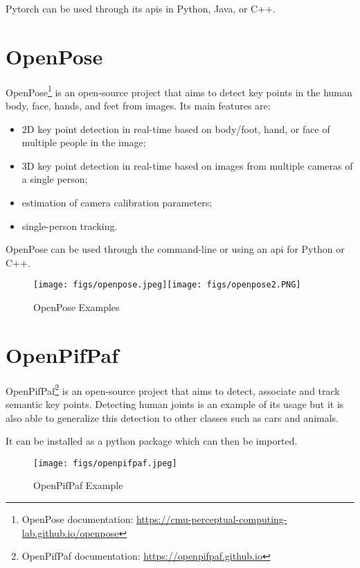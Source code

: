 Pytorch can be used through its \acp{api} in Python, Java, or C++.

\section{OpenPose}
\label{section:openpose}

OpenPose\cite{Cao2021,Simon2017,Cao2018,Wei2016}\footnote{OpenPose documentation: \url{https://cmu-perceptual-computing-lab.github.io/openpose}} is an open-source project that aims to detect key points in the human body, face, hands, and feet from images. Its main features are:

\begin{itemize}
    \item 2D key point detection in real-time based on body/foot, hand, or face of multiple people in the image;
    \item 3D key point detection in real-time based on images from multiple cameras of a single person;
    \item estimation of camera calibration parameters;
    \item single-person tracking.
\end{itemize}

OpenPose can be used through the command-line or using an \acs{api} for Python or C++.

\begin{figure}[H]
\centerline{\texttt{[image: figs/openpose.jpeg]}\texttt{[image: figs/openpose2.PNG]}}
\caption{OpenPose Examples\cite{Cao2021,Simon2017}}
\label{openpose}
\end{figure}

\section{OpenPifPaf}

OpenPifPaf\cite{Kreiss2021,Kreiss2019}\footnote{OpenPifPaf documentation: \url{https://openpifpaf.github.io}} is an open-source project that aims to detect, associate and track semantic key points. Detecting human joints is an example of its usage but it is also able to generalize this detection to other classes such as cars and animals.

It can be installed as a python package which can then be imported.

\begin{figure}[H]
\centerline{\texttt{[image: figs/openpifpaf.jpeg]}}
\caption{OpenPifPaf Example\cite{Kreiss2021}}
\label{openpifpaf}
\end{figure}